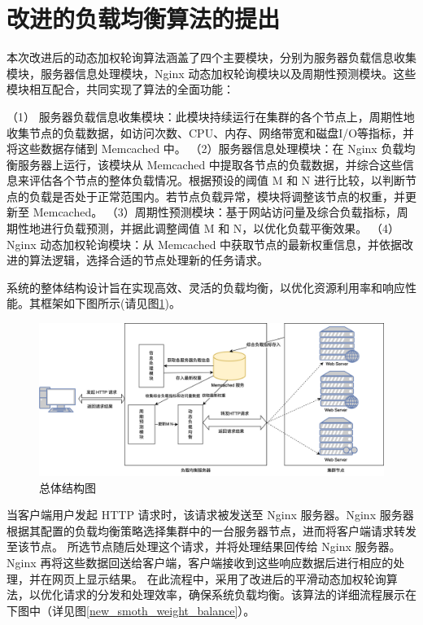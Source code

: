 \section{改进的负载均衡算法的提出}
本次改进后的动态加权轮询算法涵盖了四个主要模块，分别为服务器负载信息收集模块，服务器信息处理模块，Nginx 动态加权轮询模块以及周期性预测模块。这些模块相互配合，共同实现了算法的全面功能：

（1） 服务器负载信息收集模块：此模块持续运行在集群的各个节点上，周期性地收集节点的负载数据，如访问次数、CPU、内存、网络带宽和磁盘I/O等指标，并将这些数据存储到 Memcached 中。
（2）服务器信息处理模块：在 Nginx 负载均衡服务器上运行，该模块从 Memcached 中提取各节点的负载数据，并综合这些信息来评估各个节点的整体负载情况。根据预设的阈值 M 和 N 进行比较，以判断节点的负载是否处于正常范围内。若节点负载异常，模块将调整该节点的权重，并更新至 Memcached。
（3）周期性预测模块：基于网站访问量及综合负载指标，周期性地进行负载预测，并据此调整阈值 M 和 N，以优化负载平衡效果。
（4）Nginx 动态加权轮询模块：从 Memcached 中获取节点的最新权重信息，并依据改进的算法逻辑，选择合适的节点处理新的任务请求。

系统的整体结构设计旨在实现高效、灵活的负载均衡，以优化资源利用率和响应性能。其框架如下图所示(请见图\ref{total_structure_flow})。

\begin{figure}[htbp]
	\centering
	\includegraphics[width=\textwidth]{figures/landbalance_module.png}
	\caption{总体结构图}
	\label{total_structure_flow}
\end{figure}

当客户端用户发起 HTTP 请求时，该请求被发送至 Nginx 服务器。Nginx 服务器根据其配置的负载均衡策略选择集群中的一台服务器节点，进而将客户端请求转发至该节点。
所选节点随后处理这个请求，并将处理结果回传给 Nginx 服务器。Nginx 再将这些数据回送给客户端，客户端接收到这些响应数据后进行相应的处理，并在网页上显示结果。
在此流程中，采用了改进后的平滑动态加权轮询算法，以优化请求的分发和处理效率，确保系统负载均衡。该算法的详细流程展示在下图中（详见图\ref{new_smoth_weight_balance}）。

